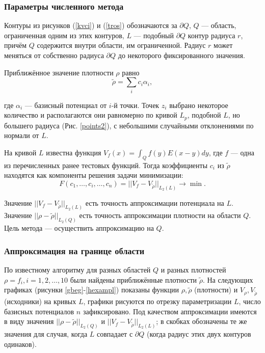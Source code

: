 \documentclass[a4paper]{article}
\newcommand{\V}[1]{\int_Q #1(y) E(x-y) dy}
\begin{document}
\subsubsection{Параметры численного метода}
Контуры из рисунков (\ref{kvci}) и (\ref{tros}) обозначаются за $\partial Q$, $Q$ --- область, ограниченная одним из этих контуров,
$L$ --- подобный $\partial Q$ контур радиуса $r$, причём $Q$ содержится внутри области, им ограниченной. Радиус $r$ может меняться от собственно радиуса $\partial Q$ до некоторого фиксированного значения.

Приближённое значение плотности $\rho$ равно
\begin{equation*}
  \tilde{\rho} = \sum_i c_i \alpha_i,
\end{equation*}

где $\alpha_i$ --- базисный потенциал от $i$-й точки.
Точек $z_i$ выбрано некоторое количество и располагаются они равномерно по кривой $L_p$, подобной $L$, но большего радиуса (Рис. \ref{points2}), с небольшими случайными отклонениями по нормали от $L$.

На кривой $L$ известна функция $V_f(x)=\V{f}$, где $f$ --- одна из перечисленных ранее тестовых функций.
Тогда коэффициенты $c_i$ из $\tilde{\rho}$ находятся как компоненты решения задачи минимизации:
\begin{equation*}
  F(c_1,\dots,c_i,\dots,c_n)=||V_f-V_{\tilde{\rho} } ||_{L_2(L)}\rightarrow \min.
\end{equation*}

Значение $||V_f-V_{\tilde{\rho} } ||_{L_2(L)}$ есть точность аппроксимации потенциала на $L$.
Значение $||\rho-\tilde{\rho} ||_{L_2(Q)}$ есть точность аппроксимации плотности на области $Q$.
Цель метода --- осуществить аппроксимацию на $Q$.

\subsubsection{Аппроксимация на границе области}
По известному алгоритму для разных областей $Q$ и разных плотностей $\rho=f_i,i=1,2,\dots,10$ были найдены приближённые плотности $\tilde{\rho}$.
На следующих графиках (рисунки \ref{gbeg}-\ref{hexampl}) показаны функции $\rho, \tilde{\rho}$ (плотности) и $V_{\rho},V_{\tilde{\rho}}$ (исходники) на кривых $L$, графики рисуются по отрезку параметризации $L$, число базисных потенциалов $n$ зафиксировано.
Под качеством аппроксимации имеются в виду значения $||\rho-\tilde{\rho} ||_{L_2(Q)}$ и $||V_f-V_{\tilde{\rho} } ||_{L_2(L)}$; в скобках обозначены те же значения для случая, когда $L$ совпадает с $\partial Q$ (когда радиус этих двух контуров одинаков).
\end{document}
